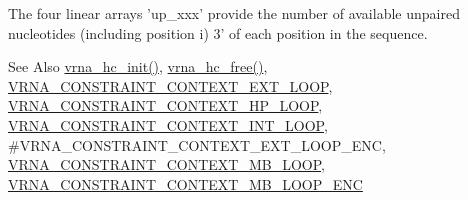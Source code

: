 The four linear arrays 'up\-\_\-xxx' provide the number of available unpaired nucleotides (including position i) 3' of each position in the sequence.

\begin{DoxySeeAlso}{See Also}
\hyperlink{group__hard__constraints_ga36ff456c43bf920629cee5a236e4f0ff}{vrna\-\_\-hc\-\_\-init()}, \hyperlink{group__hard__constraints_ga696dcf77887d856c6f21ea266d8b9ca2}{vrna\-\_\-hc\-\_\-free()}, \hyperlink{group__hard__constraints_ga9418eda62a5dec070896702c279d2548}{V\-R\-N\-A\-\_\-\-C\-O\-N\-S\-T\-R\-A\-I\-N\-T\-\_\-\-C\-O\-N\-T\-E\-X\-T\-\_\-\-E\-X\-T\-\_\-\-L\-O\-O\-P}, \hyperlink{group__hard__constraints_ga79203702b197b6b9d3b78eed40663eb1}{V\-R\-N\-A\-\_\-\-C\-O\-N\-S\-T\-R\-A\-I\-N\-T\-\_\-\-C\-O\-N\-T\-E\-X\-T\-\_\-\-H\-P\-\_\-\-L\-O\-O\-P}, \hyperlink{group__hard__constraints_ga21feeab3a9e5fa5a9e3d9ac0fcf5994f}{V\-R\-N\-A\-\_\-\-C\-O\-N\-S\-T\-R\-A\-I\-N\-T\-\_\-\-C\-O\-N\-T\-E\-X\-T\-\_\-\-I\-N\-T\-\_\-\-L\-O\-O\-P}, \#\-V\-R\-N\-A\-\_\-\-C\-O\-N\-S\-T\-R\-A\-I\-N\-T\-\_\-\-C\-O\-N\-T\-E\-X\-T\-\_\-\-E\-X\-T\-\_\-\-L\-O\-O\-P\-\_\-\-E\-N\-C, \hyperlink{group__hard__constraints_ga456ecd2ff00056bb64da8dd4f61bbfc5}{V\-R\-N\-A\-\_\-\-C\-O\-N\-S\-T\-R\-A\-I\-N\-T\-\_\-\-C\-O\-N\-T\-E\-X\-T\-\_\-\-M\-B\-\_\-\-L\-O\-O\-P}, \hyperlink{group__hard__constraints_ga02a3d703ddbcfce393e4bbfcb9db7077}{V\-R\-N\-A\-\_\-\-C\-O\-N\-S\-T\-R\-A\-I\-N\-T\-\_\-\-C\-O\-N\-T\-E\-X\-T\-\_\-\-M\-B\-\_\-\-L\-O\-O\-P\-\_\-\-E\-N\-C} 
\end{DoxySeeAlso}
